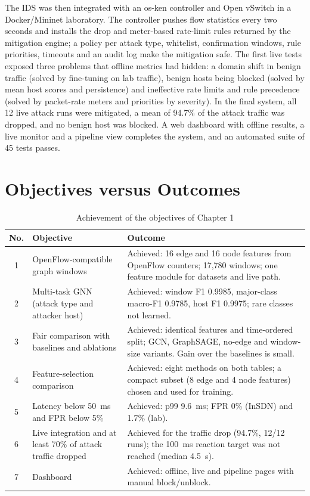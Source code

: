 The IDS was then integrated with an os-ken controller and Open vSwitch in a Docker/Mininet laboratory. The controller pushes flow statistics every two seconds and installs the drop and meter-based rate-limit rules returned by the mitigation engine; a policy per attack type, whitelist, confirmation windows, rule priorities, timeouts and an audit log make the mitigation safe. The first live tests exposed three problems that offline metrics had hidden: a domain shift in benign traffic (solved by fine-tuning on lab traffic), benign hosts being blocked (solved by mean host scores and persistence) and ineffective rate limits and rule precedence (solved by packet-rate meters and priorities by severity). In the final system, all 12 live attack runs were mitigated, a mean of 94.7\% of the attack traffic was dropped, and no benign host was blocked. A web dashboard with offline results, a live monitor and a pipeline view completes the system, and an automated suite of 45 tests passes.


\section{Objectives versus Outcomes}
\begin{table}[htbp]
\centering
\caption{Achievement of the objectives of Chapter 1}
\label{tab:objectives}
\small
\begin{tabularx}{\textwidth}{|c|p{5.2cm}|X|}
\hline
\textbf{No.} & \textbf{Objective} & \textbf{Outcome} \\ \hline
1 & OpenFlow-compatible graph windows & Achieved: 16 edge and 16 node features from OpenFlow counters; 17,780 windows; one feature module for datasets and live path. \\ \hline
2 & Multi-task GNN (attack type and attacker host) & Achieved: window F1 0.9985, major-class macro-F1 0.9785, host F1 0.9975; rare classes not learned. \\ \hline
3 & Fair comparison with baselines and ablations & Achieved: identical features and time-ordered split; GCN, GraphSAGE, no-edge and window-size variants. Gain over the baselines is small. \\ \hline
4 & Feature-selection comparison & Achieved: eight methods on both tables; a compact subset (8 edge and 4 node features) chosen and used for training. \\ \hline
5 & Latency below 50~ms and FPR below 5\% & Achieved: p99 9.6~ms; FPR 0\% (InSDN) and 1.7\% (lab). \\ \hline
6 & Live integration and at least 70\% of attack traffic dropped & Achieved for the traffic drop (94.7\%, 12/12 runs); the 100~ms reaction target was not reached (median 4.5~s). \\ \hline
7 & Dashboard & Achieved: offline, live and pipeline pages with manual block/unblock. \\ \hline
\end{tabularx}
\end{table}

